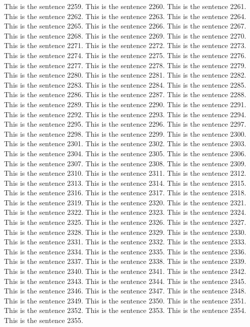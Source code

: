 \documentclass{article}
\begin{document}
This is the sentence 2259.
This is the sentence 2260.
This is the sentence 2261.
This is the sentence 2262.
This is the sentence 2263.
This is the sentence 2264.
This is the sentence 2265.
This is the sentence 2266.
This is the sentence 2267.
This is the sentence 2268.
This is the sentence 2269.
This is the sentence 2270.
This is the sentence 2271.
This is the sentence 2272.
This is the sentence 2273.
This is the sentence 2274.
This is the sentence 2275.
This is the sentence 2276.
This is the sentence 2277.
This is the sentence 2278.
This is the sentence 2279.
This is the sentence 2280.
This is the sentence 2281.
This is the sentence 2282.
This is the sentence 2283.
This is the sentence 2284.
This is the sentence 2285.
This is the sentence 2286.
This is the sentence 2287.
This is the sentence 2288.
This is the sentence 2289.
This is the sentence 2290.
This is the sentence 2291.
This is the sentence 2292.
This is the sentence 2293.
This is the sentence 2294.
This is the sentence 2295.
This is the sentence 2296.
This is the sentence 2297.
This is the sentence 2298.
This is the sentence 2299.
This is the sentence 2300.
This is the sentence 2301.
This is the sentence 2302.
This is the sentence 2303.
This is the sentence 2304.
This is the sentence 2305.
This is the sentence 2306.
This is the sentence 2307.
This is the sentence 2308.
This is the sentence 2309.
This is the sentence 2310.
This is the sentence 2311.
This is the sentence 2312.
This is the sentence 2313.
This is the sentence 2314.
This is the sentence 2315.
This is the sentence 2316.
This is the sentence 2317.
This is the sentence 2318.
This is the sentence 2319.
This is the sentence 2320.
This is the sentence 2321.
This is the sentence 2322.
This is the sentence 2323.
This is the sentence 2324.
This is the sentence 2325.
This is the sentence 2326.
This is the sentence 2327.
This is the sentence 2328.
This is the sentence 2329.
This is the sentence 2330.
This is the sentence 2331.
This is the sentence 2332.
This is the sentence 2333.
This is the sentence 2334.
This is the sentence 2335.
This is the sentence 2336.
This is the sentence 2337.
This is the sentence 2338.
This is the sentence 2339.
This is the sentence 2340.
This is the sentence 2341.
This is the sentence 2342.
This is the sentence 2343.
This is the sentence 2344.
This is the sentence 2345.
This is the sentence 2346.
This is the sentence 2347.
This is the sentence 2348.
This is the sentence 2349.
This is the sentence 2350.
This is the sentence 2351.
This is the sentence 2352.
This is the sentence 2353.
This is the sentence 2354.
This is the sentence 2355.
\end{document}
